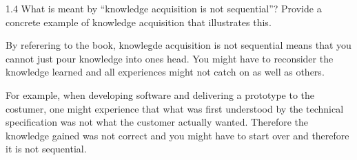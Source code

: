1.4 
What is meant by “knowledge acquisition is not sequential”? Provide a concrete example of knowledge acquisition that illustrates this.

By referering to the book, knowlegde acquisition is not sequential means that you cannot just pour knowledge into ones head. You might have to reconsider the knowledge learned and all experiences might not catch on as well as others.

For example, when developing software and delivering a prototype to the costumer, one might experience that what was first understood by the technical specification was not what the customer actually wanted. Therefore the knowledge gained was not correct and you might have to start over and therefore it is not sequential.